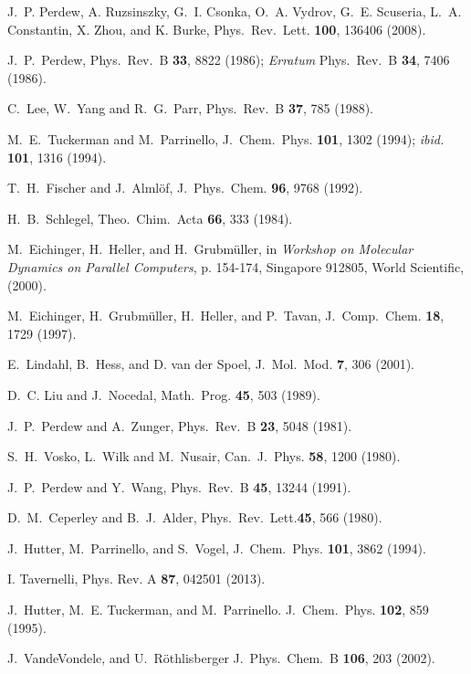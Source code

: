 \documentclass[twoside,10pt,titlepage,a4paper]{article}
\begin{document}
\begin{thebibliography}{999}
    J.~P. Perdew, A. Ruzsinszky, G.~I. Csonka, O.~A. Vydrov, G.~E. Scuseria,
    L.~A. Constantin, X. Zhou, and K. Burke,
    Phys.~Rev.~Lett. {\bf 100}, 136406 (2008).

    J.~P.~Perdew,
    Phys.~Rev.~B {\bf 33}, 8822 (1986);
    {\it Erratum} Phys.~Rev.~B {\bf 34}, 7406 (1986).

    C.~Lee, W.~Yang and R.~G.~Parr,
    Phys.~Rev.~B {\bf 37}, 785 (1988).

    M.~E.~Tuckerman and M.~Parrinello, J.~Chem.~Phys.
    {\bf 101}, 1302 (1994); {\it ibid.} {\bf 101}, 1316 (1994).

    T.~H.~Fischer and J.~Alml\"of,
    J.~Phys.~Chem. {\bf 96}, 9768 (1992).

    H.~B.~Schlegel, Theo.~Chim.~Acta {\bf 66}, 333 (1984).

 M.~Eichinger, H.~Heller, and H.~Grubm\"uller,
   in
   {\em Workshop on Molecular Dynamics on Parallel Computers},
   p. 154-174, Singapore 912805, World Scientific, (2000).

 M.~Eichinger, H.~Grubm\"uller, H.~Heller, and P.~Tavan,
    J.~Comp.~Chem. {\bf 18}, 1729 (1997).

    E.~Lindahl, B.~Hess, and D. van der Spoel,
    J.~Mol.~Mod. {\bf 7}, 306 (2001).

    D.~C. Liu and J.~Nocedal,
    Math.~Prog. {\bf 45}, 503 (1989).

    J.~P.~Perdew and A.~Zunger,
    Phys.~Rev.~B {\bf 23}, 5048 (1981).

    S.~H.~Vosko, L.~Wilk and M.~Nusair,
    Can.~J.~Phys. {\bf 58}, 1200 (1980).

    J.~P.~Perdew and Y.~Wang, 
    Phys.~Rev.~B {\bf 45}, 13244 (1991).

    D.~M.~Ceperley and B.~J.~Alder,
    Phys.~Rev.~Lett.{\bf 45}, 566 (1980).

    J.~Hutter, M.~Parrinello, and S.~Vogel,
    J.~Chem.~Phys. {\bf 101}, 3862 (1994).

    I. Tavernelli,
    Phys. Rev. A {\bf 87}, 042501 (2013).

    J.~Hutter, M.~E. Tuckerman, and M.~Parrinello.
    J.~Chem.~Phys. {\bf 102}, 859 (1995).

    J.~VandeVondele, and U.~R\"othlisberger
    J.~Phys.~Chem.~B {\bf 106}, 203 (2002).


\end{thebibliography}
\end{document}
